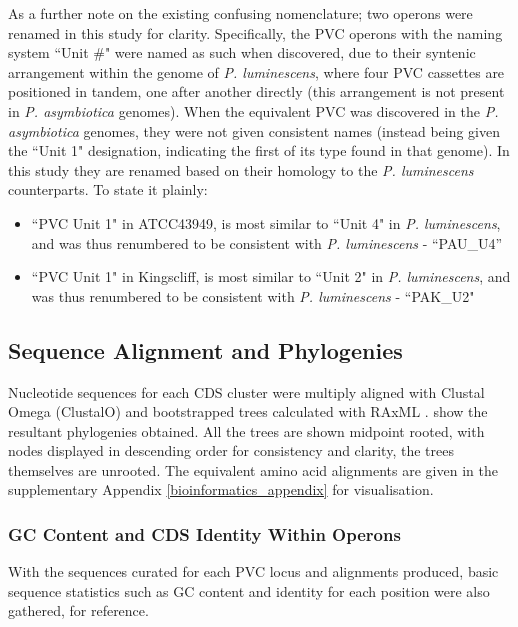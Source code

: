 As a further note on the existing confusing nomenclature; two operons were renamed in this study for clarity. Specifically, the PVC operons with the naming system ``Unit \#" were named as such when discovered, due to their syntenic arrangement within the genome of \emph{P. luminescens}, where four PVC cassettes are positioned in tandem, one after another directly (this arrangement is not present in \emph{P. asymbiotica} genomes). When the equivalent PVC was discovered in the \emph{P. asymbiotica} genomes, they were not given consistent names (instead being given the ``Unit 1" designation, indicating the first of its type found in that genome). In this study they are renamed based on their homology to the \emph{P. luminescens} counterparts. To state it plainly:

\begin{itemize}
	\item ``PVC Unit 1" in \Pa{} ATCC43949, is most similar to ``Unit 4" in \emph{P. luminescens}, and was thus renumbered to be consistent with \emph{P. luminescens} - ``PAU\_U4''
	\item ``PVC Unit  1" in \Pa{} Kingscliff, is most similar to ``Unit 2" in \emph{P. luminescens}, and was thus renumbered to be consistent with \emph{P. luminescens} - ``PAK\_U2"
\end{itemize}

\subsection{Sequence Alignment and Phylogenies}
	Nucleotide sequences for each CDS cluster were multiply aligned with Clustal Omega (ClustalO) \citep{Sievers2011} and bootstrapped trees calculated with RAxML \citep{Stamatakis2014}.  show the resultant phylogenies obtained. All the trees are shown midpoint rooted, with nodes displayed in descending order for consistency and clarity, the trees themselves are unrooted. The equivalent amino acid alignments are given in the supplementary Appendix \vref{bioinformatics_appendix} for visualisation.

\subsubsection{GC Content and CDS Identity Within Operons}
With the sequences curated for each PVC locus and alignments produced, basic sequence statistics such as GC content and identity for each position were also gathered, for reference. 

